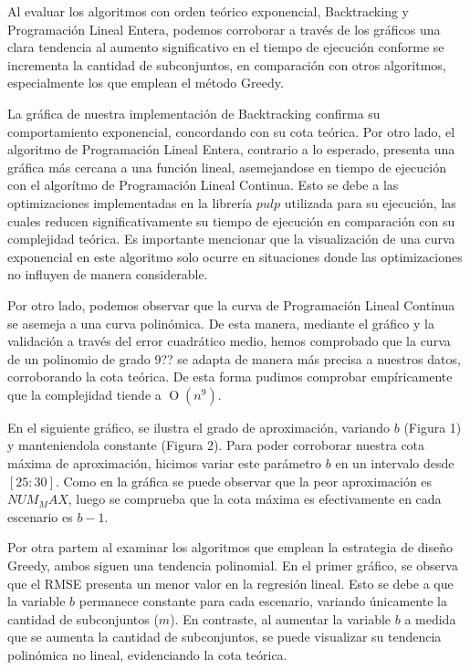Al evaluar los algoritmos con orden teórico exponencial, Backtracking y Programación Lineal Entera, podemos corroborar a través de los gráficos una clara tendencia al aumento significativo en el tiempo de ejecución conforme se incrementa la cantidad de subconjuntos, en comparación con otros algoritmos, especialmente los que emplean el método Greedy.

La gráfica de nuestra implementación de Backtracking confirma su comportamiento exponencial, concordando con su cota teórica. Por otro lado, el algoritmo de Programación Lineal Entera, contrario a lo esperado, presenta una gráfica más cercana a una función lineal, asemejandose en tiempo de ejecución con el algorítmo de Programación Lineal Continua. Esto se debe a las optimizaciones implementadas en la librería $pulp$ utilizada para su ejecución, las cuales reducen significativamente su tiempo de ejecución en comparación con su complejidad teórica. Es importante mencionar que la visualización de una curva exponencial en este algoritmo solo ocurre en situaciones donde las optimizaciones no influyen de manera considerable.

Por otro lado, podemos observar que la curva de Programación Lineal Continua se asemeja a una curva polinómica. De esta manera, mediante el gráfico y la validación a través del error cuadrático medio, hemos comprobado que la curva de un polinomio de grado 9?? se adapta de manera más precisa a nuestros datos, corroborando la cota teórica. De esta forma pudimos comprobar empíricamente que la complejidad tiende a $\operatorname{O}(n^{9})$. 

En el siguiente gráfico, se ilustra el grado de aproximación, variando $b$ (Figura 1) y manteniendola constante (Figura 2). Para poder corroborar nuestra cota máxima de aproximación, hicimos variar este parámetro $b$ en un intervalo desde $[25:30]$. Como en la gráfica se puede observar que la peor aproximación es $NUM_MAX$, luego se comprueba que la cota máxima es efectivamente en cada escenario es $b-1$.

Por otra partem al examinar los algoritmos que emplean la estrategia de diseño Greedy, ambos siguen una tendencia polinomial. En el primer gráfico, se observa que el RMSE presenta un menor valor en la regresión lineal. Esto se debe a que la variable $b$ permanece constante para cada escenario, variando únicamente la cantidad de subconjuntos ($m$). En contraste, al aumentar la variable $b$ a medida que se aumenta la cantidad de subconjuntos, se puede visualizar su tendencia polinómica no lineal, evidenciando la cota teórica. 

